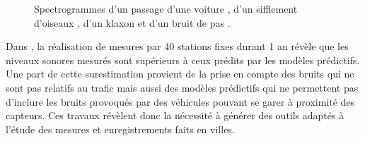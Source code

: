 \begin{figure}[t]
\centering
{}
\caption{Spectrogrammes d'un passage d'une voiture , d'un sifflement d'oiseaux , d'un klaxon  et d'un bruit de pas .}
\label{fig:sourceUrbain}
\end{figure}


Dans \cite{Mioduszewski}, la réalisation de mesures par 40 stations fixes durant 1 an révèle que les niveaux sonores mesurés sont supérieurs à ceux prédits par les modèles prédictifs. Une part de cette surestimation provient de la prise en compte des bruits qui ne sont pas relatifs au trafic  mais aussi des modèles prédictifs qui ne permettent pas d'inclure les bruits provoqués par des véhicules pouvant se garer à proximité des capteurs. Ces travaux révèlent donc la nécessité à générer des outils adaptés à l'étude des mesures et enregistrements faits en villes. 



